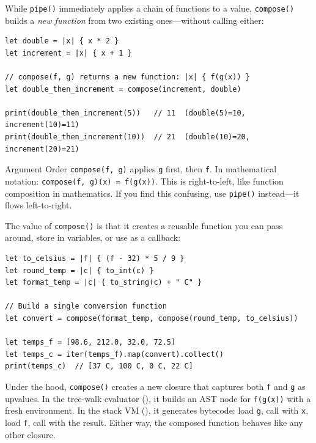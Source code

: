While \lstinline|pipe()| immediately applies a chain of functions to a value, \lstinline|compose()| builds a \emph{new function} from two existing ones---without calling either:

\begin{lstlisting}[language=Lattice, caption={Composing functions}]
let double = |x| { x * 2 }
let increment = |x| { x + 1 }

// compose(f, g) returns a new function: |x| { f(g(x)) }
let double_then_increment = compose(increment, double)

print(double_then_increment(5))   // 11  (double(5)=10, increment(10)=11)
print(double_then_increment(10))  // 21  (double(10)=20, increment(20)=21)
\end{lstlisting}

\begin{warnbox}{Argument Order}
\lstinline|compose(f, g)| applies \lstinline|g| first, then \lstinline|f|.
In mathematical notation: \lstinline|compose(f, g)(x) = f(g(x))|.
This is right-to-left, like function composition in mathematics.
If you find this confusing, use \lstinline|pipe()| instead---it flows left-to-right.
\end{warnbox}

The value of \lstinline|compose()| is that it creates a reusable function you can pass around, store in variables, or use as a callback:

\begin{lstlisting}[language=Lattice, caption={Composed functions as callbacks}]
let to_celsius = |f| { (f - 32) * 5 / 9 }
let round_temp = |c| { to_int(c) }
let format_temp = |c| { to_string(c) + " C" }

// Build a single conversion function
let convert = compose(format_temp, compose(round_temp, to_celsius))

let temps_f = [98.6, 212.0, 32.0, 72.5]
let temps_c = iter(temps_f).map(convert).collect()
print(temps_c)  // [37 C, 100 C, 0 C, 22 C]
\end{lstlisting}

Under the hood, \lstinline|compose()| creates a new closure that captures both \lstinline|f| and \lstinline|g| as upvalues.
In the tree-walk evaluator (), it builds an AST node for \lstinline|f(g(x))| with a fresh environment.
In the stack VM (), it generates bytecode: load \lstinline|g|, call with \lstinline|x|, load \lstinline|f|, call with the result.
Either way, the composed function behaves like any other closure.

